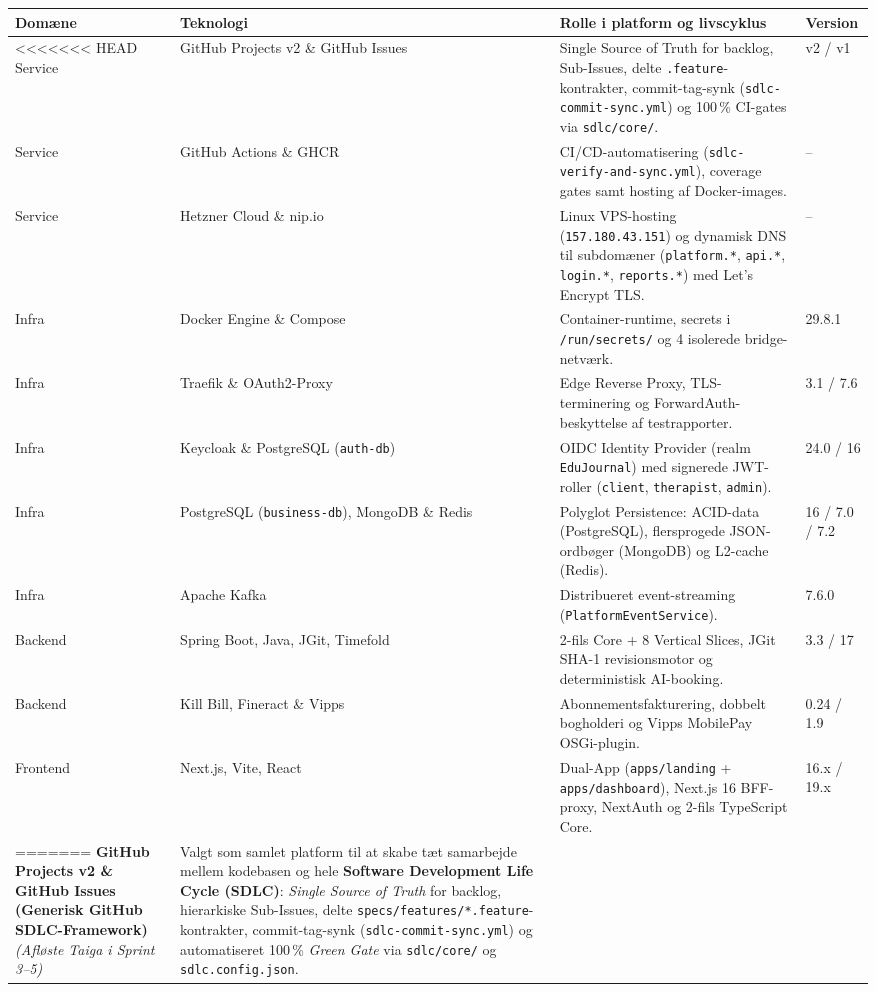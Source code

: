 \documentclass[11pt,a4paper]{article}
\begin{document}
\begin{table}[htbp]
\begin{table}[htbp]
\centering
\small
\begin{tabularx}{\textwidth}{P{2.2cm} P{4.0cm} Y P{1.6cm}}
\toprule
\textbf{Domæne} & \textbf{Teknologi} & \textbf{Rolle i platform og livscyklus} & \textbf{Version} \\
\midrule
<<<<<<< HEAD
Service & GitHub Projects v2 \& GitHub Issues & Single Source of Truth for backlog, Sub-Issues, delte \texttt{.feature}-kontrakter, commit-tag-synk (\texttt{sdlc-commit-sync.yml}) og 100\,\% CI-gates via \texttt{sdlc/core/}. & v2 / v1 \\
Service & GitHub Actions \& GHCR & CI/CD-automatisering (\texttt{sdlc-verify-and-sync.yml}), coverage gates samt hosting af Docker-images. & -- \\
Service & Hetzner Cloud \& nip.io & Linux VPS-hosting (\texttt{157.180.43.151}) og dynamisk DNS til subdomæner (\texttt{platform.*}, \texttt{api.*}, \texttt{login.*}, \texttt{reports.*}) med Let's Encrypt TLS. & -- \\
Infra & Docker Engine \& Compose & Container-runtime, secrets i \texttt{/run/secrets/} og 4 isolerede bridge-netværk. & 29.8.1 \\
Infra & Traefik \& OAuth2-Proxy & Edge Reverse Proxy, TLS-terminering og ForwardAuth-beskyttelse af testrapporter. & 3.1 / 7.6 \\
Infra & Keycloak \& PostgreSQL (\texttt{auth-db}) & OIDC Identity Provider (realm \texttt{EduJournal}) med signerede JWT-roller (\texttt{client}, \texttt{therapist}, \texttt{admin}). & 24.0 / 16 \\
Infra & PostgreSQL (\texttt{business-db}), MongoDB \& Redis & Polyglot Persistence: ACID-data (PostgreSQL), flersprogede JSON-ordbøger (MongoDB) og L2-cache (Redis). & 16 / 7.0 / 7.2 \\
Infra & Apache Kafka & Distribueret event-streaming (\texttt{PlatformEventService}). & 7.6.0 \\
Backend & Spring Boot, Java, JGit, Timefold & 2-fils Core + 8 Vertical Slices, JGit SHA-1 revisionsmotor og deterministisk AI-booking. & 3.3 / 17 \\
Backend & Kill Bill, Fineract \& Vipps & Abonnementsfakturering, dobbelt bogholderi og Vipps MobilePay OSGi-plugin. & 0.24 / 1.9 \\
Frontend & Next.js, Vite, React & Dual-App (\texttt{apps/landing} + \texttt{apps/dashboard}), Next.js 16 BFF-proxy, NextAuth og 2-fils TypeScript Core. & 16.x / 19.x \\
=======
\textbf{GitHub Projects v2 \& GitHub Issues (Generisk GitHub SDLC-Framework)}\newline \textit{(Afløste Taiga i Sprint 3--5)} & Valgt som samlet platform til at skabe tæt samarbejde mellem kodebasen og hele \textbf{Software Development Life Cycle (SDLC)}: \textit{Single Source of Truth} for backlog, hierarkiske Sub-Issues, delte \texttt{specs/features/*.feature}-kontrakter, commit-tag-synk (\texttt{sdlc-commit-sync.yml}) og automatiseret 100\,\% \textit{Green Gate} via \texttt{sdlc/core/} og \texttt{sdlc.config.json}. \\

\end{tabularx}
\end{table}
\end{table}
\end{document}
